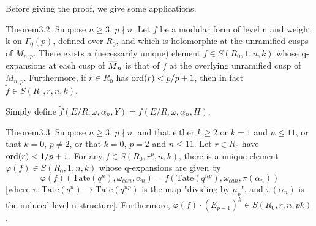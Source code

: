 Before giving the proof, we give some applications.


\begin{kathm}{Theorem}{3.2.}
Suppose $n\geq 3$, $p\nmid n$. Let $f$ be a modular form of level n and weight
k on $\Gamma_0(p)$, defined over $R_0$, and which is holomorphic at the
unramified cusps of $\widetilde{M}_{n,p}$. There exists a (necessarily unique)
element $\widetilde{f}\in S(R_0,1,n,k)$ whose q-expansions at each cusp of
$\overline{M}_n$ is that of $\widetilde{f}$ at the overlying unramified cusp of
$\widetilde{M}_{n,p}$. Furthermore, if $r\in R_0$ has $\operatorname{ord}(r)<p/p+1$, then in
fact $\widetilde{f}\in S(R_0,r,n,k)$.
\end{kathm}

\begin{kaproof}
Simply define $\widetilde{f}(E/R,\omega,\alpha_n,Y) = f(E/R,\omega,\alpha_n,H)$.
\end{kaproof}


\begin{kathm}{Theorem}{3.3.}
Suppose $n\geq 3$, $p\nmid n$, and that either $k\geq 2$ or $k=1$ and
$n\leq 11$, or that $k=0$, $p\neq 2$, or that $k=0$, $p=2$ and $n\leq 11$. Let
$r\in R_0$ have $\operatorname{ord}(r)<1/p+1$. For any $f\in S(R_0,r^p,n,k)$, there is a
unique element $\varphi(f)\in S(R_0,1,n,k)$ whose q-expansions are given by
\[
\varphi(f)(\mathrm{Tate}(q^n),\omega_{can},\alpha_n) =
f(\mathrm{Tate}(q^{np}),\omega_{can},\pi(\alpha_n))
\]
[where $\pi\colon \mathrm{Tate}(q^n)\to\mathrm{Tate}(q^{np})$ is the map
"dividing by $\mu_p$", and $\pi(\alpha_n)$ is the induced level n-structure].
Furthermore, $\varphi(f)\cdot(E_{p-1})^k\in S(R_0,r,n,pk)$.
\end{kathm}


